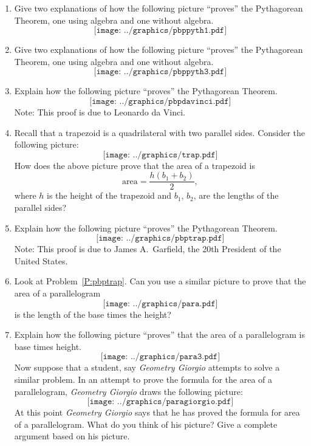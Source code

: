 \begin{problems}
\begin{enumerate}
\item Give two explanations of how the following picture ``proves''
  the Pythagorean Theorem, one using algebra and one without algebra. 
\[
\texttt{[image: ../graphics/pbppyth1.pdf]}
\]
\item Give two explanations of how the following picture ``proves''
  the Pythagorean Theorem, one using algebra and one without algebra. 
\[
\texttt{[image: ../graphics/pbppyth3.pdf]}
\]
\item Explain how the following picture ``proves'' the Pythagorean Theorem.
\[
\texttt{[image: ../graphics/pbpdavinci.pdf]}
\]
Note: This proof is due to Leonardo da Vinci.
\item\label{P:pbptrap} Recall that a trapezoid is a quadrilateral with two parallel sides. Consider the following picture:
\[
\texttt{[image: ../graphics/trap.pdf]}
\]
How does the above picture prove that the area of a trapezoid is
\[
\mathrm{area}= \frac{h(b_1 + b_2)}{2},
\]
where $h$ is the height of the trapezoid and $b_1$, $b_2$, are the lengths of the parallel sides?
\item Explain how the following picture ``proves'' the Pythagorean Theorem.
\[
\texttt{[image: ../graphics/pbptrap.pdf]}
\]
Note: This proof is due to James A.\ Garfield, the 20th President of the United States.
\item Look at Problem~\ref{P:pbptrap}. Can you use a similar picture
  to prove that the area of a parallelogram
\[
\texttt{[image: ../graphics/para.pdf]}
\]
is the length of the base times the height?
\item Explain how the following picture ``proves'' that the area of a
  parallelogram is base times height.
\[
\texttt{[image: ../graphics/para3.pdf]}
\]
Now suppose that a student, say \textit{Geometry Giorgio} attempts to
solve a similar problem. In an attempt to prove the formula for the
area of a parallelogram, \textit{Geometry Giorgio} draws the following
picture:
\[
\texttt{[image: ../graphics/paragiorgio.pdf]}
\]
At this point \textit{Geometry Giorgio} says that he has proved the
formula for area of a parallelogram. What do you think of his picture?
Give a complete argument based on his picture.


\end{enumerate}
\end{problems}
